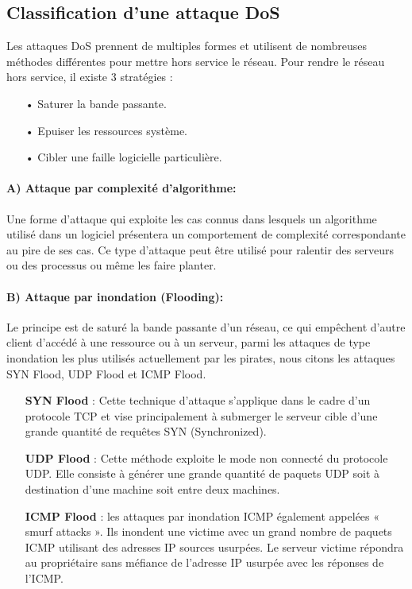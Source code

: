 \subsection{Classification d'une attaque DoS}
Les attaques DoS prennent de multiples formes et utilisent de nombreuses méthodes différentes pour mettre hors service le réseau.
Pour rendre le réseau hors service, il existe 3 stratégies :\\
\begin{itemize}
\item[•]Saturer la bande passante.
\item[•]Epuiser les ressources système.
\item[•]Cibler une faille logicielle particulière.
\end{itemize} 

\paragraph{A) Attaque par complexité d’algorithme:}
Une forme d’attaque qui exploite les cas connus dans lesquels un algorithme utilisé dans un logiciel présentera un comportement de complexité correspondante au pire de ses cas. Ce type d’attaque peut être utilisé pour ralentir des serveurs ou des processus ou même les faire planter. 
\paragraph{B) Attaque par inondation (Flooding):}
Le principe est de saturé la bande passante d’un réseau, ce qui empêchent d’autre client d’accédé à une ressource ou à un serveur, parmi les attaques de type inondation les plus utilisés actuellement par les pirates, nous citons les attaques SYN Flood, UDP Flood et ICMP Flood.\\
\begin{itemize}
\item[\textbf{SYN Flood}]: Cette technique d’attaque s’applique dans le cadre d’un protocole TCP et vise principalement à submerger le serveur cible d’une grande quantité de requêtes SYN (Synchronized).
\item[\textbf{UDP Flood}]: Cette méthode exploite le mode non connecté du protocole UDP. Elle consiste à générer une grande quantité de paquets UDP soit à destination d’une machine soit entre deux machines.
\item[\textbf{ICMP Flood}]: les attaques par inondation ICMP également appelées « smurf attacks ». Ils inondent une victime avec un grand nombre de paquets ICMP utilisant des adresses IP sources usurpées. Le serveur victime répondra au propriétaire sans méfiance de l'adresse IP usurpée avec les réponses de l'ICMP.
\end{itemize}

